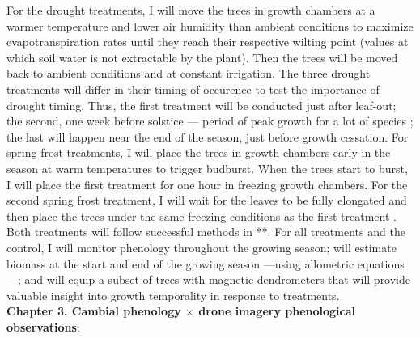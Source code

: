\documentclass[12pt]{article}
\begin{document}
For the drought treatments, I will move the trees in growth chambers at a warmer temperature and lower air humidity than ambient conditions to maximize evapotranspiration rates until they reach their respective wilting point (values at which soil water is not extractable by the plant). Then the trees will be moved back to ambient conditions and at constant irrigation. The three drought treatments will differ in their timing of occurence to test the importance of drought timing. Thus, the first treatment will be conducted just after leaf-out; the second, one week before solstice --- period of peak growth for a lot of species \citep{anderson-teixeira_carbon_2021,dorangeville_drought_2018,mcmahon_general_2015}; the last will happen near the end of the season, just before growth cessation. For spring frost treatments, I will place the trees in growth chambers early in the season at warm temperatures to trigger budburst. When the trees start to burst, I will place the first treatment for one hour in freezing growth chambers. For the second spring frost treatment, I will wait for the leaves to be fully elongated and then place the trees under the same freezing conditions as the first treatment \citep{zohner_increased_2018}. Both treatments will follow successful methods in \citet{chamberlain_late_2021}**. For all treatments and the control, I will monitor phenology throughout the growing season; will estimate biomass at the start and end of the growing season ---using allometric equations---; and will equip a subset of trees with magnetic dendrometers that will provide valuable insight into growth temporality in response to treatments. \\
\textbf{Chapter 3. Cambial phenology $\times$ drone imagery phenological observations}:
\end{document}
